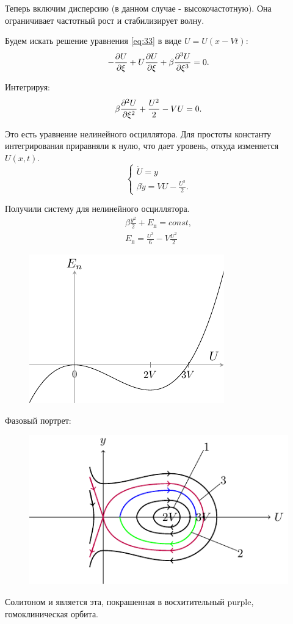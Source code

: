 Теперь включим дисперсию (в данном случае - высокочастотную). Она ограничивает частотный рост и стабилизирует волну. 

Будем искать решение уравнения \eqref{eq:33} в виде $U=U(x-Vt)$:
\begin{equation}
	-\pdv{U}{\xi}+U\pdv{U}{\xi}+\beta \pdv[3]{U}{\xi}=0.
	\label{eq:34}
\end{equation}

Интегрируя:
\begin{equation}
	\beta \pdv[2]{U}{\xi}+\frac{U^2}{2}-VU=0.
	\label{eq:35}
\end{equation}

Это есть уравнение нелинейного осциллятора. Для простоты константу интегрирования приравняли  к нулю, что дает уровень, откуда изменяется $U(x,t)$.
\begin{equation}
	\begin{cases}
		\dot{U}=y \\
		\beta \dot{y} =VU-\frac{U^2}{2}.		
	\end{cases}
	\label{eq:36}
\end{equation}

Получили систему для нелинейного осциллятора.
\begin{gather*}
	\beta \frac{y^2}{2}+E_{\text{п}} = const, \\ E_{\text{п}} = \frac{U^3}{6}-V\frac{U^2}{2}
\end{gather*}
\begin{figure}[H]
	\centering
	\includegraphics[width=0.4\linewidth]{fig/fig19.pdf}   
\end{figure}

Фазовый портрет:
\begin{figure}[H]
	\centering
	\includegraphics[width=0.5\linewidth]{fig/fig20.pdf}   
\end{figure}
Солитоном и является эта, покрашенная в восхитительный purple, гомоклиническая орбита.

